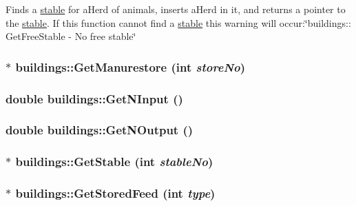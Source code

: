 \label{classbuildings_ab5f3304118e2662e0e53867aaf99a1dd}
Finds a \hyperlink{classstable}{stable} for aHerd of animals, inserts aHerd in it, and returns a pointer to the \hyperlink{classstable}{stable}. If this function cannot find a \hyperlink{classstable}{stable} this warning will occur:\char`\"{}buildings:: GetFreeStable -\/ No free stable\char`\"{} \hypertarget{classbuildings_aba1d7b741afc477fa08d0cdcdfed7e95}{
\subsubsection[{GetManurestore}]{$\ast$ buildings::GetManurestore (int {\em storeNo})}}
\label{classbuildings_aba1d7b741afc477fa08d0cdcdfed7e95}
\hypertarget{classbuildings_a8b590b3f7488bb7b95dcf936e54769da}{
\subsubsection[{GetNInput}]{\setlength{\rightskip}{0pt plus 5cm}double buildings::GetNInput ()}}
\label{classbuildings_a8b590b3f7488bb7b95dcf936e54769da}
\hypertarget{classbuildings_a48d4b22d3d794acd230f9394047e4165}{
\subsubsection[{GetNOutput}]{\setlength{\rightskip}{0pt plus 5cm}double buildings::GetNOutput ()}}
\label{classbuildings_a48d4b22d3d794acd230f9394047e4165}
\hypertarget{classbuildings_af7822b1a537bbb71b55db60c2f48b07b}{
\subsubsection[{GetStable}]{$\ast$ buildings::GetStable (int {\em stableNo})}}
\label{classbuildings_af7822b1a537bbb71b55db60c2f48b07b}
\hypertarget{classbuildings_a9b71637ed71eb2f332c3f56d774f2f6a}{
\subsubsection[{GetStoredFeed}]{ $\ast$ buildings::GetStoredFeed (int {\em type})}}
